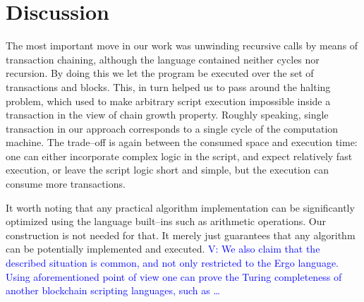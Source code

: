 \documentclass[runningheads]{llncs}
\newcommand{\vk}[1]{\textcolor{blue}{V: {#1}}}
\begin{document}
    \section{Discussion}
    \label{section3}
    The most important move in our work was unwinding recursive calls by means
    of transaction chaining, although the language contained neither cycles nor
    recursion. By doing this we let the program be executed over the set of
    transactions and blocks. This, in turn helped us to pass around the halting
    problem, which used to make arbitrary script execution impossible inside a
    transaction in the view of chain growth property. Roughly speaking, single
    transaction in our approach corresponds to a single cycle of the computation
    machine. The trade--off is again between the consumed space and execution time:
    one can either incorporate complex logic in the script, and expect
    relatively fast execution, or leave the script logic short and simple, but
    the execution can consume more transactions.

    It worth noting that any practical algorithm implementation can be
    significantly optimized using the language built--ins such as arithmetic
    operations. Our construction is not needed for that. It merely just
    guarantees that any algorithm can be potentially implemented and executed.
    \vk{We also claim that the described situation is common, and not only
    restricted to the Ergo language. Using aforementioned point of view one
    can prove the Turing completeness of another blockchain scripting
    languages, such as \ldots}
\end{document}
